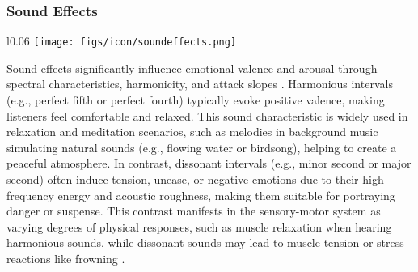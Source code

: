 \subsubsection{Sound Effects}
\begin{wrapfigure}{l}{0.06\textwidth}
   \vspace{-11pt} %
        \texttt{[image: figs/icon/soundeffects.png]}
\end{wrapfigure} 
Sound effects significantly influence emotional valence and arousal through spectral characteristics, harmonicity, and attack slopes \cite{eerola2012timbre}. Harmonious intervals (e.g., perfect fifth or perfect fourth) typically evoke positive valence, making listeners feel comfortable and relaxed. This sound characteristic is widely used in relaxation and meditation scenarios, such as melodies in background music simulating natural sounds (e.g., flowing water or birdsong), helping to create a peaceful atmosphere. In contrast, dissonant intervals (e.g., minor second or major second) often induce tension, unease, or negative emotions due to their high-frequency energy and acoustic roughness, making them suitable for portraying danger or suspense\cite{parncutt2011consonance}. This contrast manifests in the sensory-motor system as varying degrees of physical responses, such as muscle relaxation when hearing harmonious sounds, while dissonant sounds may lead to muscle tension or stress reactions like frowning \cite{james1884mind}.

